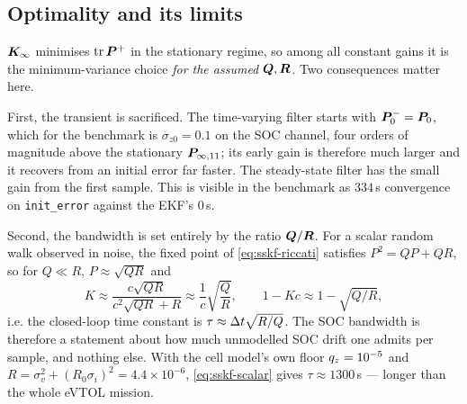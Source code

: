\subsection{Optimality and its limits}
$\bm{K}_\infty$ minimises $\operatorname{tr} \bm{P}^+$ in the stationary regime, so among all constant gains it is
the minimum-variance choice \emph{for the assumed $\bm{Q},\bm{R}$}.  Two consequences matter here.

First, the transient is sacrificed.  The time-varying filter starts with $\bm{P}^{-}_0 = \bm{P}_0$,
which for the benchmark is $\sigma_{z0}=0.1$ on the SOC channel, four orders of magnitude above
the stationary $\bm{P}_{\infty,11}$; its early gain is therefore much larger and it recovers from an
initial error far faster.  The steady-state filter has the small gain from the first sample.
This is visible in the benchmark as $334$\,s convergence on \texttt{init\_error} against the
EKF's $0$\,s.

Second, the bandwidth is set entirely by the ratio $\bm{Q}/\bm{R}$.  For a scalar random walk observed
in noise, the fixed point of \eqref{eq:sskf-riccati} satisfies $P^2 = QP + QR$, so for $Q\ll R$,
$P\approx\sqrt{QR}$ and
\begin{equation}
K \approx \frac{c\sqrt{QR}}{c^2\sqrt{QR}+R} \approx \frac{1}{c}\sqrt{\frac{Q}{R}} ,\qquad
1 - Kc \approx 1 - \sqrt{Q/R} ,
\label{eq:sskf-scalar}
\end{equation}
i.e. the closed-loop time constant is $\tau \approx \Delta t\sqrt{R/Q}$.  The SOC bandwidth is
therefore a statement about how much unmodelled SOC drift one admits per sample, and nothing
else.  With the cell model's own floor $q_{z}=10^{-5}$ and
$R = \sigma_v^2 + (R_0\sigma_i)^2 = 4.4\times10^{-6}$, \eqref{eq:sskf-scalar} gives
$\tau\approx1300$\,s --- longer than the whole eVTOL mission.

